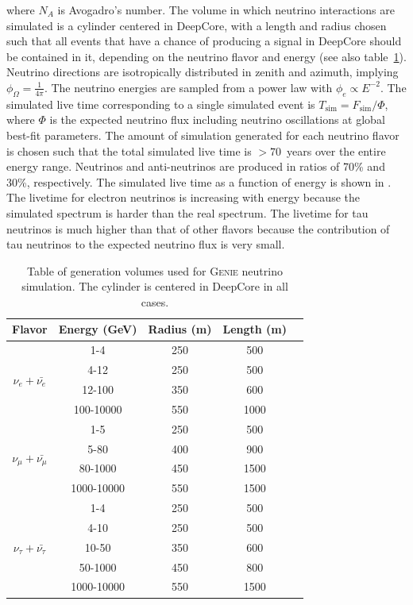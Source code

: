 where $N_A$ is Avogadro's number. The volume in which neutrino interactions are simulated is a cylinder centered in DeepCore, with a length and radius chosen such that all events that have a chance of producing a signal in DeepCore should be contained in it, depending on the neutrino flavor and energy (see also table~\ref{table:GENIE}). Neutrino directions are isotropically distributed in zenith and azimuth, implying $\phi_\Omega = \frac{1}{4\pi}$. The neutrino energies are sampled from a power law with $\phi_e \propto E^{-2}$. The simulated live time corresponding to a single simulated event is  $T_{\mathrm{sim}} =  F_{\mathrm{sim}} / \Phi$, where $\Phi$ is the expected neutrino flux including neutrino oscillations at global best-fit parameters. The amount of simulation generated for each neutrino flavor is chosen such that the total simulated live time is $>70$~years over the entire energy range. Neutrinos and anti-neutrinos are produced in ratios of 70\% and 30\%, respectively. The simulated live time as a function of energy is shown in . The livetime for electron neutrinos is increasing with energy because the simulated spectrum is harder than the real spectrum. The livetime for tau neutrinos is much higher than that of other flavors because the contribution of tau neutrinos to the expected neutrino flux is very small.

\begin{table}
\caption{Table of generation volumes used for \textsc{Genie} neutrino simulation. The cylinder is centered in DeepCore in all cases. \label{table:GENIE}}
\begin{center}
\begin{tabular}{ ccccc } 
\textbf{Flavor} & \textbf{Energy (GeV)} & \textbf{Radius (m)} & \textbf{Length (m)}\\
\toprule
\multirow{4}{*}{$\nu_e+\bar{\nu_e}$}  & 1-4 & 250 & 500 \\
 & 4-12 & 250 & 500   \\ 
 & 12-100 & 350 & 600  \\
 & 100-10000 & 550 & 1000  \\
 \midrule
\multirow{4}{*}{$\nu_{\mu}+\bar{\nu_{\mu}}$} & 1-5 & 250 & 500\\
 & 5-80 & 400 & 900\\
 & 80-1000 & 450 & 1500\\
 & 1000-10000 & 550 & 1500\\
 \midrule
\multirow{5}{*}{$\nu_{\tau}+\bar{\nu_{\tau}}$} & 1-4 & 250 & 500\\
 & 4-10 & 250 & 500\\
 & 10-50 & 350 & 600\\
 & 50-1000 & 450 & 800\\
 & 1000-10000 & 550 & 1500\\
 \bottomrule
\end{tabular}
\end{center}
\end{table}


